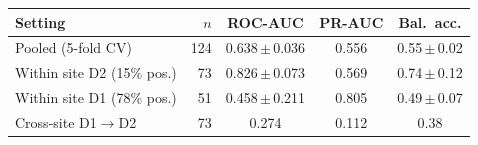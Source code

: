\begin{tabular}{lrccc}
\toprule
Setting & $n$ & ROC-AUC & PR-AUC & Bal.\ acc. \\
\midrule
Pooled (5-fold CV) & 124 & 0.638\,$\pm$\,0.036 & 0.556 & 0.55\,$\pm$\,0.02 \\
Within site D2 (15\% pos.) & 73 & 0.826\,$\pm$\,0.073 & 0.569 & 0.74\,$\pm$\,0.12 \\
Within site D1 (78\% pos.) & 51 & 0.458\,$\pm$\,0.211 & 0.805 & 0.49\,$\pm$\,0.07 \\
Cross-site D1$\rightarrow$D2 & 73 & 0.274 & 0.112 & 0.38 \\
\bottomrule
\end{tabular}
